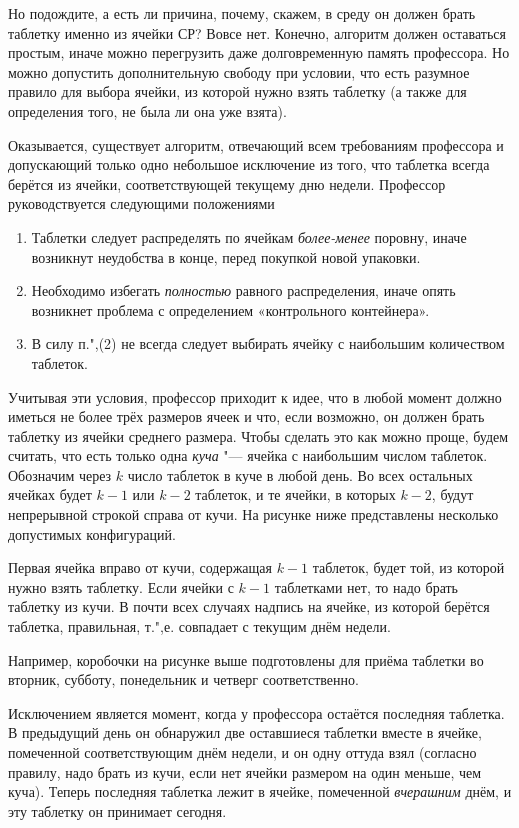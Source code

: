 \documentclass[twoside]{book}
\begin{document}
Но подождите, а есть ли причина, почему, скажем, в среду он должен брать таблетку именно из ячейки СР?
Вовсе нет.
Конечно, алгоритм должен оставаться простым, иначе можно перегрузить даже долговременную память профессора.
Но можно допустить дополнительную свободу при условии, что есть разумное правило для выбора ячейки, из которой нужно взять таблетку (а также для определения того, не была ли она уже взята).

Оказывается, существует алгоритм, отвечающий всем требованиям профессора и допускающий только одно небольшое исключение из того, что таблетка всегда берётся из ячейки, соответствующей текущему дню недели.
Профессор руководствуется следующими положениями

\begin{enumerate}[label=(\arabic*),noitemsep,leftmargin=\parindent,labelsep=3.5pt]
\item Таблетки следует распределять по ячейкам \emph{более-менее} поровну, иначе возникнут неудобства в конце, перед покупкой новой упаковки.
\item Необходимо избегать \emph{полностью} равного распределения, иначе опять возникнет проблема с определением «контрольного контейнера».
\item В силу п.",(2) не всегда следует выбирать ячейку с наибольшим количеством таблеток.
\end{enumerate}

Учитывая эти условия, профессор приходит к идее, что в любой момент должно иметься не более трёх размеров ячеек и что, если возможно, он должен брать таблетку из ячейки среднего размера.
Чтобы сделать это как можно проще, будем считать, что есть только одна \emph{куча} "--- ячейка с наибольшим числом таблеток.
Обозначим через $k$ число таблеток в куче в любой день.
Во всех остальных ячейках будет $k-1$ или $k-2$ таблеток, и те ячейки, в которых $k-2$, будут непрерывной строкой справа от кучи.
На рисунке ниже представлены несколько допустимых конфигураций.

Первая ячейка вправо от кучи, содержащая $k-1$ таблеток, будет той, из которой нужно взять таблетку.
Если ячейки с $k-1$ таблетками нет, то надо брать таблетку из кучи.
В почти всех случаях надпись на ячейке, из которой берётся таблетка, правильная, т.",е. совпадает с текущим днём недели.

Например, коробочки на рисунке выше подготовлены для приёма таблетки во вторник, субботу, понедельник и четверг соответственно.

Исключением является момент, когда у профессора остаётся последняя таблетка.
В предыдущий день он обнаружил две оставшиеся таблетки вместе в ячейке, помеченной соответствующим днём недели, и он одну оттуда взял (согласно правилу, надо брать из кучи, если нет ячейки размером на один меньше, чем куча).
Теперь последняя таблетка лежит в ячейке, помеченной \emph{вчерашним} днём, и эту таблетку он принимает сегодня.
\end{document}
